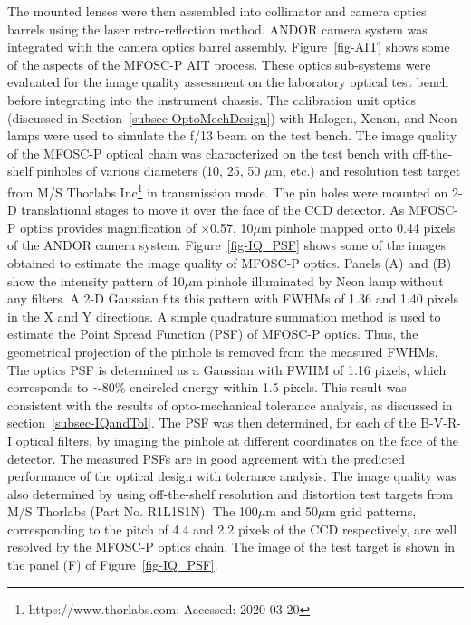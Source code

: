 \par  	
The mounted lenses were then assembled into collimator and camera optics barrels using the laser retro-reflection method. ANDOR camera system was integrated with the camera optics barrel assembly. Figure~\ref{fig-AIT} shows some of the aspects of the MFOSC-P AIT process. These optics sub-systems were evaluated for the image quality assessment on the laboratory optical test bench before integrating into the instrument chassis. The calibration unit optics (discussed in Section~\ref{subsec-OptoMechDesign}) with Halogen, Xenon, and Neon lamps were used to simulate the f/13 beam on the test bench. The image quality of the MFOSC-P optical chain was characterized on the test bench with off-the-shelf pinholes of various diameters (10, 25, 50 $\mu$m, etc.) and resolution test target from M/S Thorlabs Inc\footnote{https://www.thorlabs.com; Accessed: 2020-03-20} in transmission mode. The pin holes were mounted on 2-D translational stages to move it over the face of the CCD detector. As MFOSC-P optics provides magnification of $\times$0.57, 10$\mu$m pinhole mapped onto 0.44 pixels of the ANDOR camera system. Figure~\ref{fig-IQ_PSF} shows some of the images obtained to estimate the image quality of MFOSC-P optics. Panels (A) and (B) show the intensity pattern of 10$\mu$m pinhole illuminated by Neon lamp without any filters. A 2-D Gaussian fits this pattern with FWHMs of 1.36 and 1.40 pixels in the X and Y directions.  A simple quadrature summation method is used to estimate the Point Spread Function (PSF) of MFOSC-P optics. Thus, the geometrical projection of the pinhole is removed from the measured FWHMs. The optics PSF is determined as a Gaussian with FWHM of 1.16 pixels, which corresponds to $\sim$80$\%$ encircled energy within 1.5 pixels. This result was consistent with the results of opto-mechanical tolerance analysis, as discussed in section~\ref{subsec-IQandTol}. The PSF was then determined, for each of the B-V-R-I optical filters, by imaging the pinhole at different coordinates on the face of the detector. The measured PSFs are in good agreement with the predicted performance of the optical design with tolerance analysis. The image quality was also determined by using off-the-shelf resolution and distortion test targets from M/S Thorlabs (Part No. R1L1S1N). The 100$\mu$m and 50$\mu$m grid patterns, corresponding to the pitch of 4.4 and 2.2 pixels of the CCD respectively, are well resolved by the MFOSC-P optics chain. The image of the test target is shown in the panel (F) of Figure~\ref{fig-IQ_PSF}.

